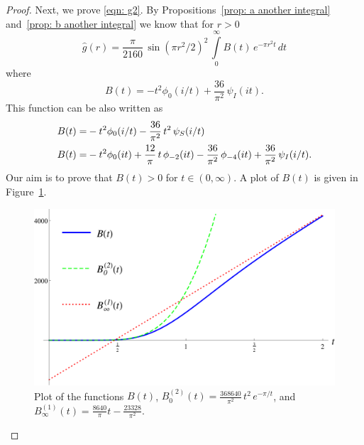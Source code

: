 \begin{proof}
  Next, we prove \eqref{eqn: g2}. By Propositions~\ref{prop: a another integral} and~\ref{prop: b another integral} we know that for $r>0$
  \begin{equation}\label{eqn: g B} \widehat{g}(r)=\frac{\pi}{2160}\,\sin(\pi r^2/2)^2\,\int\limits_0^\infty B(t)\,e^{-\pi r^2 t}\,dt\end{equation}
  where $$B(t)=-t^2\phi_0(i/t)+\frac{36}{\pi^2}\,\psi_I(it).$$
  This function can be also written as
  \begin{align}
   B(t)=&-t^2\phi_0(i/t)-\frac{36}{\pi^2}\,t^2\,\psi_S(i/t)\notag\\
   B(t)=&-t^2\phi_0(it)+\frac{12}{\pi}\,t\,\phi_{-2}(it)-\frac{36}{\pi^2}\,\phi_{-4}(it)+\frac{36}{\pi^2}\,\psi_I(i/t).\notag
  \end{align}
  Our aim is to prove that $B(t)>0$ for $t\in(0,\infty)$. A plot of $B(t)$ is given in Figure~\ref{fig:B}.
  \begin{figure}[h!]
  \caption{Plot of the functions $B(t)$, $B^{(2)}_0(t)=\frac{368640}{\pi^2}\,t^2\,e^{-\pi /t}$, and $B^{(1)}_\infty(t)=\frac{8640}{\pi}t-\frac{23328}{\pi^2}$.\label{fig:B}}
    \centering
  \includegraphics[width=300 pt]{graphics/e8plot_B.pdf}
  \end{figure}


\end{proof}
